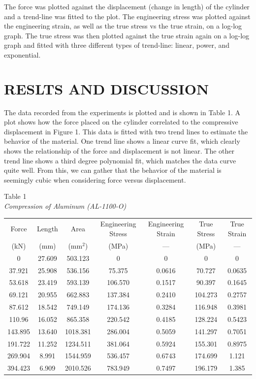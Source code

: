 \documentclass[12pt]{article}
\begin{document}
The force was plotted against the displacement (change in length) of the cylinder and a trend-line was fitted to the plot. The engineering stress was plotted against the engineering strain, as well as the true stress vs the true strain, on a log-log graph. The true stress was then plotted against the true strain again on a log-log graph and fitted with three different types of trend-line: linear, power, and exponential.
\bigskip


\section*{\fontsize{12}{12}\selectfont RESLTS AND DISCUSSION}
The data recorded from the experiments is plotted and is shown in Table 1. A plot shows how the force placed on the cylinder correlated to the compressive displacement in Figure 1. This data is fitted with two trend lines to estimate the behavior of the material. One trend line shows a linear curve fit, which clearly shows the relationship of the force and displacement is not linear. The other trend line shows a third degree polynomial fit, which matches the data curve quite well. From this, we can gather that the behavior of the material is seemingly cubic when considering force versus displacement.

\newpage

\begin{center}
Table 1 
\\
\emph{Compression of Aluminum (AL-1100-O)}
\\
\bigskip
\begin{tabular}{ c c c c c c c }
\hline
Force & Length & Area & Engineering Stress & Engineering Strain & True Stress & True Strain\\
(kN) & (mm) & (mm$^2$) & (MPa) & --- & (MPa) & ---\\
\hline
0 & 27.609 & 503.123 & 0 & 0 & 0 & 0\\
37.921 & 25.908 & 536.156 & 75.375 & 0.0616 &  70.727 & 0.0635\\
53.618 & 23.419 & 593.139 & 106.570 & 0.1517 & 90.397 & 0.1645\\
69.121 & 20.955 & 662.883 & 137.384 & 0.2410 & 104.273 & 0.2757\\
87.612 & 18.542 & 749.149 & 174.136 & 0.3284 & 116.948 & 0.3981\\
110.96 & 16.052 & 865.358 & 220.542 & 0.4185 & 128.224 & 0.5423\\
143.895 & 13.640 & 1018.381 & 286.004 & 0.5059 & 141.297 & 0.7051\\
191.722 & 11.252 & 1234.511 & 381.064 & 0.5924 & 155.301 & 0.8975\\
269.904 & 8.991 & 1544.959 & 536.457 & 0.6743 & 174.699 & 1.121\\
394.423 & 6.909 & 2010.526 & 783.949 & 0.7497 & 196.179 & 1.385\\
\hline
\end{tabular}
\end{center}
\end{document}

